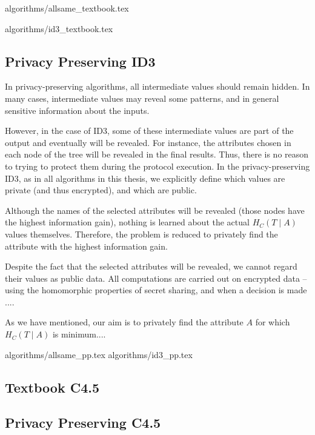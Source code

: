 {algorithms/allsame_textbook.tex}

{algorithms/id3_textbook.tex}



\subsection{Privacy Preserving ID3}\label{s:pp-id3}


In privacy-preserving algorithms, all intermediate values should remain hidden.
In many cases, intermediate values may reveal some patterns, and in general sensitive information about the inputs.

However, in the case of ID3, some of these intermediate values are part of the output and eventually will be revealed.
For instance, the attributes chosen in each node of the tree will be revealed in the final results.
Thus, there is no reason to trying to protect them during the protocol execution.
In the privacy-preserving ID3, as in all algorithms in this thesis, we explicitly define which values are private (and thus encrypted), and which are public.

Although the names of the selected attributes will be revealed (those nodes have the highest information gain), nothing is learned about the actual $H_C(T \mid A)$ values themselves.
Therefore, the problem is reduced to privately find the attribute with the highest information gain.

Despite the fact that the selected attributes will be revealed, we cannot regard their values as public data.
All computations are carried out on encrypted data -- using the homomorphic properties of secret sharing, and when a decision is made ....



As we have mentioned, our aim is to privately find the attribute $A$ for which $H_C(T \mid A)$ is minimum....


{algorithms/allsame_pp.tex}
{algorithms/id3_pp.tex}




\subsection{Textbook C4.5}\label{s:c45}

\subsection{Privacy Preserving C4.5}\label{s:pp-c45}


